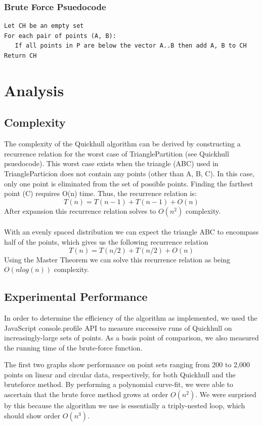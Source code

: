 \documentclass[11pt]{article}
\begin{document}
\subsubsection{Brute Force Psuedocode}
\begin{verbatim}
Let CH be an empty set
For each pair of points (A, B):
   If all points in P are below the vector A..B then add A, B to CH
Return CH
\end{verbatim}

\section{Analysis}

\subsection{Complexity}
The complexity of the Quickhull algorithm can be derived by constructing a recurrence relation for the worst case of TrianglePartition (see Quickhull psuedocode). This worst case exists when the triangle (ABC) used in TriangleParticion does not contain any points (other than A, B, C). In this case, only one point is eliminated from the set of possible points. Finding the farthest point (C) requires O(n) time. Thus, the recurrence relation is:
\[ T(n) = T(n - 1) + T(n - 1) + O(n) \]
After expansion this recurrence relation solves to $O(n^2)$ complexity\cite{Kent:QH}.
\\
\\
With an evenly spaced distribution we can expect the triangle ABC to encompass half of the points, which gives us the following recurrence relation
\[ T(n) = T(n / 2) + T(n / 2) + O(n) \]
Using the Master Theorem we can solve this recurrence relation as being $O(n log(n))$ complexity\cite{Kent:QH}.

\subsection{Experimental Performance}
In order to determine the efficiency of the algorithm as implemented, we used the JavaScript console.profile API to measure successive runs of Quickhull on increasingly-large sets of points. As a basis point of comparison, we also measured the running time of the brute-force function.

The first two graphs show performance on point sets ranging from 200 to 2,000 points on linear and circular data, respectively, for both Quickhull and the bruteforce method. By performing a polynomial curve-fit, we were able to ascertain that the brute force method grows at order $O(n^2)$. We were surprised by this because the algorithm we use is essentially a triply-nested loop, which should show order $O(n^3)$.
\end{document}
